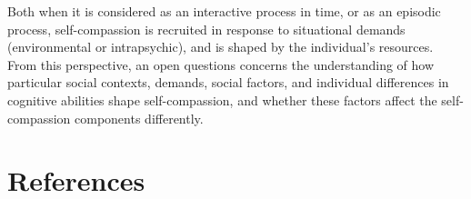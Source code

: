 \documentclass[
  man]{apa7}
\begin{document}
Both when it is considered as an interactive process in time, or as an episodic process, self-compassion is recruited in response to situational demands (environmental or intrapsychic), and is shaped by the individual's resources. From this perspective, an open questions concerns the understanding of how particular social contexts, demands, social factors, and individual differences in cognitive abilities shape self-compassion, and whether these factors affect the self-compassion components differently.

\newpage

\hypertarget{references}{%
\section{References}\label{references}}
\end{document}
